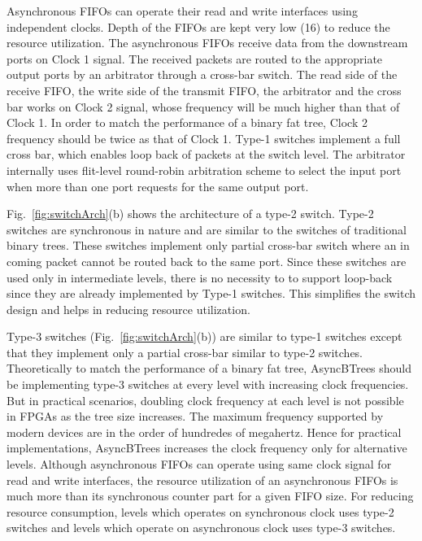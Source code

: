 Asynchronous FIFOs can operate their read and write interfaces using independent clocks.
Depth of the FIFOs are kept very low (16) to reduce the resource utilization.
The asynchronous FIFOs receive data from the downstream ports on Clock 1 signal.
The received packets are routed to the appropriate output ports by an arbitrator through a cross-bar switch.
The read side of the receive FIFO, the write side of the transmit FIFO, the arbitrator and the cross bar works on Clock 2 signal, whose frequency will be much higher than that of Clock 1.
In order to match the performance of a binary fat tree, Clock 2 frequency should be twice as that of Clock 1.
Type-1 switches implement a full cross bar, which enables loop back of packets at the switch level.
The arbitrator internally uses flit-level round-robin arbitration scheme to select the input port when more than one port requests for the same output port.

Fig.~\ref{fig:switchArch}(b) shows the architecture of a type-2 switch.
Type-2 switches are synchronous in nature and are similar to the switches of traditional binary trees.
These switches implement only partial cross-bar switch where an in coming packet cannot be routed back to the same port.
Since these switches are used only in intermediate levels, there is no necessity to to support loop-back since they are already implemented by Type-1 switches.
This simplifies the switch design and helps in reducing resource utilization.

Type-3 switches (Fig.~\ref{fig:switchArch}(b)) are similar to type-1 switches except that they implement only a partial cross-bar similar to type-2 switches.
Theoretically to match the performance of a binary fat tree, AsyncBTrees should be implementing type-3 switches at every level with increasing clock frequencies.
But in practical scenarios, doubling clock frequency at each level is not possible in FPGAs as the tree size increases.
The maximum frequency supported by modern devices are in the order of hundredes of megahertz.
Hence for practical implementations, AsyncBTrees increases the clock frequency only for alternative levels. 
Although asynchronous FIFOs can operate using same clock signal for read and write interfaces, the resource utilization of an asynchronous FIFOs is much more than its synchronous counter part for a given FIFO size.
For reducing resource consumption, levels which operates on synchronous clock uses type-2 switches and levels which operate on asynchronous clock uses type-3 switches.

